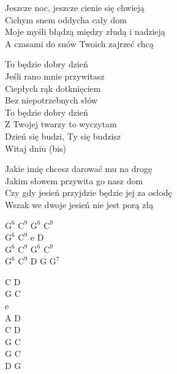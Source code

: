 \begin{text}
    Jeszcze noc, jeszcze cienie się chwieją\\
    Cichym snem oddycha cały dom \\
    Moje myśli błądzą między złudą i nadzieją\\
    A czasami do snów Twoich zajrzeć chcą

    To będzie dobry dzień\\
    Jeśli rano mnie przywitasz\\
    Ciepłych rąk dotknięciem\\
    Bez niepotrzebnych słów\\
    To będzie dobry dzień\\
    Z Twojej twarzy to wyczytam\\
    Dzień się budzi, Ty się budzisz\\
    Witaj dniu (bis)

    Jakie imię chcesz darować mu na drogę\\
    Jakim słowem przywita go nasz dom\\
    Czy gdy jesień przyjdzie będzie jej za osłodę\\
    Wszak we dwoje jesień nie jest porą złą
\end{text}
\begin{chord}
    $\mathrm{G^6}$ $\mathrm{C^9}$ $\mathrm{G^6}$ $\mathrm{C^9}$\\
    $\mathrm{G^6}$ $\mathrm{C^9}$ e D\\
    $\mathrm{G^6}$ $\mathrm{C^9}$ $\mathrm{G^6}$ $\mathrm{C^9}$\\
    $\mathrm{G^6}$ $\mathrm{C^9}$ D G $\mathrm{G^7}$

    C D\\
    G C\\
    e\\
    A D\\
    C D\\
    G C\\
    G C\\
    D G
\end{chord}
